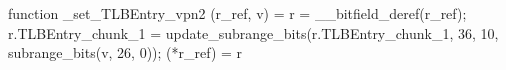 function _set_TLBEntry_vpn2 (r_ref, v) = {
    r = __bitfield_deref(r_ref);
    r.TLBEntry_chunk_1 = update_subrange_bits(r.TLBEntry_chunk_1, 36, 10, subrange_bits(v, 26, 0));
    (*r_ref) = r
}
